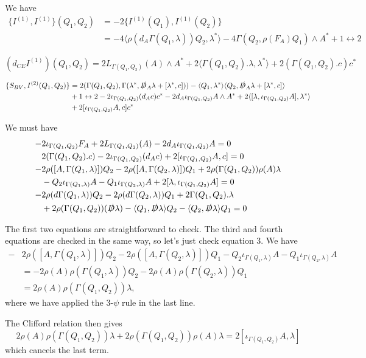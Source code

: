 \documentclass[12pt]{amsart}
\newcommand{\sD}{\slashed{D}}
\begin{document}
We have
\begin{align*}
\{I^{(1)}, I^{(1)}\}(Q_1, Q_2) &= -2\{I^{(1)}(Q_1), I^{(1)}(Q_2)\} \\
&= -4\langle \rho(d_A \Gamma(Q_1, \lambda))Q_2, \lambda^*\rangle - 4\Gamma(Q_2, \rho(F_A)Q_1)\wedge A^* + 1\leftrightarrow 2
\end{align*}

\[
(d_{CE} I^{(1)})(Q_1, Q_2) = 2L_{\Gamma(Q_1, Q_2)}(A)\wedge A^* +2\langle\Gamma(Q_1, Q_2).\lambda, \lambda^*\rangle + 2(\Gamma(Q_1, Q_2).c) c^*
\]

\begin{align*}
\{S_{BV}, I^{(2)}(Q_1, Q_2)\} &= 2(\Gamma(Q_1, Q_2), \Gamma(\lambda^*, \sD_A \lambda + [\lambda^*, c])) - \langle Q_1, \lambda^*\rangle\langle Q_2, \sD_A \lambda + [\lambda^*, c]\rangle \\
&+ 1\leftrightarrow 2 - 2\iota_{\Gamma(Q_1, Q_2)}(d_A c) c^* -2d_A\iota_{\Gamma(Q_1, Q_2)} A\wedge A^* +2\langle[\lambda, \iota_{\Gamma(Q_1, Q_2)}A], \lambda^*\rangle \\
&+2[\iota_{\Gamma(Q_1, Q_2)} A, c] c^*
\end{align*}

We must have
\begin{align*}
-&2\iota_{\Gamma(Q_1, Q_2)} F_A +2 L_{\Gamma(Q_1, Q_2)}(A) -2 d_A\iota_{\Gamma(Q_1, Q_2)} A = 0 \\
&2(\Gamma(Q_1, Q_2).c) - 2\iota_{\Gamma(Q_1, Q_2)}(d_A c) +2[\iota_{\Gamma(Q_1, Q_2)} A, c] = 0 \\
-&2\rho([A, \Gamma(Q_1, \lambda)])Q_2 -2\rho([A, \Gamma(Q_2, \lambda)])Q_1 + 2\rho(\Gamma(Q_1, Q_2))\rho(A)\lambda \\
&- Q_2\iota_{\Gamma(Q_1, \lambda)} A - Q_1\iota_{\Gamma(Q_2, \lambda)} A +2[\lambda, \iota_{\Gamma(Q_1, Q_2)} A] = 0 \\
-&2\rho(d \Gamma(Q_1, \lambda))Q_2 - 2\rho(d \Gamma(Q_2, \lambda))Q_1 + 2\Gamma(Q_1, Q_2).\lambda \\
&+2\rho(\Gamma(Q_1, Q_2))(\sD \lambda) -\langle Q_1, \sD \lambda\rangle Q_2 -\langle Q_2, \sD \lambda\rangle Q_1 = 0
\end{align*}

The first two equations are straightforward to check. The third and fourth equations are checked in the same way, so let's just check equation 3. We have
\begin{align*}
-&2\rho([A, \Gamma(Q_1, \lambda)]) Q_2 - 2\rho([A, \Gamma(Q_2, \lambda)])Q_1- Q_2\iota_{\Gamma(Q_1, \lambda)} A - Q_1\iota_{\Gamma(Q_2, \lambda)} A \\
&= -2\rho(A)\rho(\Gamma(Q_1, \lambda))Q_2 - 2\rho(A)\rho(\Gamma(Q_2, \lambda))Q_1 \\
&= 2\rho(A)\rho(\Gamma(Q_1, Q_2))\lambda,
\end{align*}
where we have applied the 3-$\psi$ rule in the last line.

The Clifford relation then gives
\[2\rho(A)\rho(\Gamma(Q_1, Q_2))\lambda + 2\rho(\Gamma(Q_1, Q_2)) \rho(A)\lambda = 2[\iota_{\Gamma(Q_1, Q_2)} A, \lambda]\]
which cancels the last term.
\end{document}
